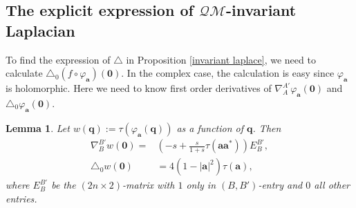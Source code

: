 \documentclass[a4paper,11pt]{amsart}
\numberwithin{equation}{section}
\newtheorem{lem}{Lemma}[section]
\begin{document}
\subsection{The explicit expression of $\mathcal{QM}$-invariant Laplacian}
To find the expression of $\triangle$ in Proposition \ref{invariant laplace}, we need to calculate $\triangle_0(f\circ \varphi_{\mathbf{a}})(\mathbf{0})$. In the complex case, the calculation is easy since $\varphi_{\mathbf{a}}$ is holomorphic. Here we need to know first order derivatives of $\nabla_{A}^{A'}\varphi_{\mathbf{a}}(\mathbf{0})$ and $\triangle_0\varphi_{\mathbf{a}}(\mathbf{0})$.
\begin{lem}\label{1st differ}
Let $w(\mathbf{q}):=\tau(\varphi_{\mathbf{a}}(\mathbf{q}))$ as a function of $\mathbf{q}$. Then
\begin{equation}\begin{aligned}\label{rewritten eq 1st de AneqB}
\nabla_{B}^{B'} w(\mathbf{0})=&\left(-s+\frac{s}{1+s}\tau(\mathbf{a}\mathbf{a}^*)\right)E_B^{B'},\\
\triangle_0 w(\mathbf{0})&=4(1-|\mathbf{a}|^2)\tau(\mathbf{a}),
\end{aligned}\end{equation}
where $E_B^{B'}$ be the $(2n\times 2)$-matrix with $1$ only in $(B,B')$-entry and $0$ all other entries.
\end{lem}
\end{document}
